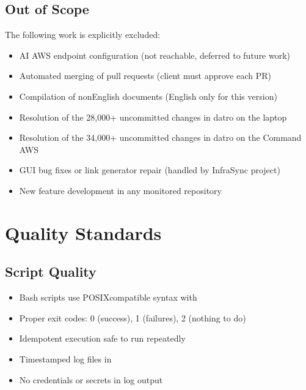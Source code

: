\documentclass[letterpaper,10pt,openany,oneside,english]{sphinxmanual}
\begin{document}
\subsection{Out of Scope}
\label{\detokenize{scope:out-of-scope}}
\sphinxAtStartPar
The following work is explicitly excluded:
\begin{itemize}
\item {} 
\sphinxAtStartPar
AI AWS endpoint configuration (not reachable, deferred to future work)

\item {} 
\sphinxAtStartPar
Automated merging of pull requests (client must approve each PR)

\item {} 
\sphinxAtStartPar
Compilation of non\sphinxhyphen{}English documents (English only for this version)

\item {} 
\sphinxAtStartPar
Resolution of the 28,000+ uncommitted changes in datro on the laptop

\item {} 
\sphinxAtStartPar
Resolution of the 34,000+ uncommitted changes in datro on the Command AWS

\item {} 
\sphinxAtStartPar
GUI bug fixes or link generator repair (handled by InfraSync project)

\item {} 
\sphinxAtStartPar
New feature development in any monitored repository

\end{itemize}

\sphinxstepscope


\section{Quality Standards}
\label{\detokenize{quality:quality-standards}}\label{\detokenize{quality::doc}}

\subsection{Script Quality}
\label{\detokenize{quality:script-quality}}\begin{itemize}
\item {} 
\sphinxAtStartPar
Bash scripts use POSIX\sphinxhyphen{}compatible syntax with 

\item {} 
\sphinxAtStartPar
Proper exit codes: 0 (success), 1 (failures), 2 (nothing to do)

\item {} 
\sphinxAtStartPar
Idempotent execution \textendash{} safe to run repeatedly

\item {} 
\sphinxAtStartPar
Timestamped log files in 

\item {} 
\sphinxAtStartPar
No credentials or secrets in log output

\end{itemize}
\end{document}
